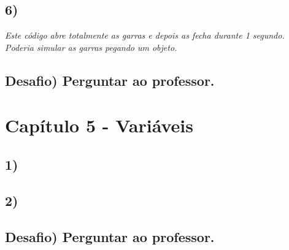  
 
    \subsection*{6)}
    \textsl{Este código abre totalmente as garras e depois as fecha durante 1 segundo. Poderia simular as garras pegando um objeto.}
    
    \subsection*{Desafio) Perguntar ao professor.}
    
\section*{Capítulo 5 - Variáveis}

    \subsection*{1)}
 
 
    \subsection*{2)}
 







    
    \subsection*{Desafio) Perguntar ao professor.}

